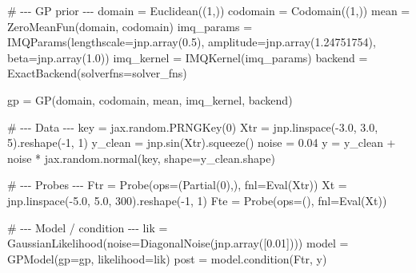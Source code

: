 \documentclass[
  letterpaper,
  DIV=11,
  numbers=noendperiod]{scrartcl}
\newenvironment{Shaded}{\begin{snugshade}}{\end{snugshade}}
\newcommand{\CommentTok}[1]{\textcolor[rgb]{0.37,0.37,0.37}{#1}}
\newcommand{\DecValTok}[1]{\textcolor[rgb]{0.68,0.00,0.00}{#1}}
\newcommand{\FloatTok}[1]{\textcolor[rgb]{0.68,0.00,0.00}{#1}}
\newcommand{\NormalTok}[1]{\textcolor[rgb]{0.00,0.23,0.31}{#1}}
\newcommand{\OperatorTok}[1]{\textcolor[rgb]{0.37,0.37,0.37}{#1}}
\begin{document}
\begin{Shaded}
\begin{Highlighting}[]
\CommentTok{\# {-}{-}{-} GP prior {-}{-}{-}}
\NormalTok{domain   }\OperatorTok{=}\NormalTok{ Euclidean((}\DecValTok{1}\NormalTok{,))}
\NormalTok{codomain }\OperatorTok{=}\NormalTok{ Codomain((}\DecValTok{1}\NormalTok{,))}
\NormalTok{mean     }\OperatorTok{=}\NormalTok{ ZeroMeanFun(domain, codomain)}
\NormalTok{imq\_params }\OperatorTok{=}\NormalTok{ IMQParams(lengthscale}\OperatorTok{=}\NormalTok{jnp.array(}\FloatTok{0.5}\NormalTok{), amplitude}\OperatorTok{=}\NormalTok{jnp.array(}\FloatTok{1.24751754}\NormalTok{), beta}\OperatorTok{=}\NormalTok{jnp.array(}\FloatTok{1.0}\NormalTok{))}
\NormalTok{imq\_kernel   }\OperatorTok{=}\NormalTok{ IMQKernel(imq\_params)}
\NormalTok{backend }\OperatorTok{=}\NormalTok{ ExactBackend(solverfns}\OperatorTok{=}\NormalTok{solver\_fns)}

\NormalTok{gp }\OperatorTok{=}\NormalTok{ GP(domain, codomain, mean, imq\_kernel, backend)}

\CommentTok{\# {-}{-}{-} Data {-}{-}{-}}
\NormalTok{key }\OperatorTok{=}\NormalTok{ jax.random.PRNGKey(}\DecValTok{0}\NormalTok{)}
\NormalTok{Xtr }\OperatorTok{=}\NormalTok{ jnp.linspace(}\OperatorTok{{-}}\FloatTok{3.0}\NormalTok{, }\FloatTok{3.0}\NormalTok{, }\DecValTok{5}\NormalTok{).reshape(}\OperatorTok{{-}}\DecValTok{1}\NormalTok{, }\DecValTok{1}\NormalTok{)}
\NormalTok{y\_clean }\OperatorTok{=}\NormalTok{ jnp.sin(Xtr).squeeze()}
\NormalTok{noise }\OperatorTok{=} \FloatTok{0.04}
\NormalTok{y }\OperatorTok{=}\NormalTok{ y\_clean }\OperatorTok{+}\NormalTok{ noise }\OperatorTok{*}\NormalTok{ jax.random.normal(key, shape}\OperatorTok{=}\NormalTok{y\_clean.shape)}

\CommentTok{\# {-}{-}{-} Probes {-}{-}{-}}
\NormalTok{Ftr }\OperatorTok{=}\NormalTok{ Probe(ops}\OperatorTok{=}\NormalTok{(Partial(}\DecValTok{0}\NormalTok{),), fnl}\OperatorTok{=}\NormalTok{Eval(Xtr))}
\NormalTok{Xt }\OperatorTok{=}\NormalTok{ jnp.linspace(}\OperatorTok{{-}}\FloatTok{5.0}\NormalTok{, }\FloatTok{5.0}\NormalTok{, }\DecValTok{300}\NormalTok{).reshape(}\OperatorTok{{-}}\DecValTok{1}\NormalTok{, }\DecValTok{1}\NormalTok{)}
\NormalTok{Fte }\OperatorTok{=}\NormalTok{ Probe(ops}\OperatorTok{=}\NormalTok{(), fnl}\OperatorTok{=}\NormalTok{Eval(Xt))}

\CommentTok{\# {-}{-}{-} Model / condition {-}{-}{-}}
\NormalTok{lik }\OperatorTok{=}\NormalTok{ GaussianLikelihood(noise}\OperatorTok{=}\NormalTok{DiagonalNoise(jnp.array([}\FloatTok{0.01}\NormalTok{])))}
\NormalTok{model }\OperatorTok{=}\NormalTok{ GPModel(gp}\OperatorTok{=}\NormalTok{gp, likelihood}\OperatorTok{=}\NormalTok{lik)}
\NormalTok{post }\OperatorTok{=}\NormalTok{ model.condition(Ftr, y)}


\end{Highlighting}
\end{Shaded}
\end{document}
